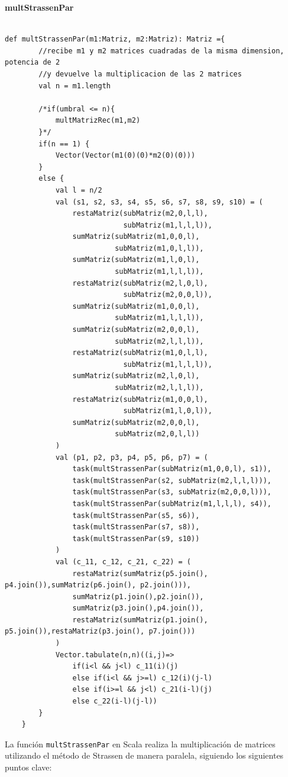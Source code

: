 \documentclass[12pt, a4paper]{article}
\begin{document}
\textbf{{multStrassenPar}} \\ \\
\begin{lstlisting}[caption=mult Strassen paralela, label=lst:scala_code11]
    def multStrassenPar(m1:Matriz, m2:Matriz): Matriz ={
        //recibe m1 y m2 matrices cuadradas de la misma dimension, potencia de 2
        //y devuelve la multiplicacion de las 2 matrices
        val n = m1.length
        
        /*if(umbral <= n){
            multMatrizRec(m1,m2)
        }*/
        if(n == 1) {
            Vector(Vector(m1(0)(0)*m2(0)(0)))
        }
        else {           
            val l = n/2
            val (s1, s2, s3, s4, s5, s6, s7, s8, s9, s10) = (
                restaMatriz(subMatriz(m2,0,l,l), 
                            subMatriz(m1,l,l,l)),
                sumMatriz(subMatriz(m1,0,0,l), 
                          subMatriz(m1,0,l,l)),
                sumMatriz(subMatriz(m1,l,0,l), 
                          subMatriz(m1,l,l,l)),
                restaMatriz(subMatriz(m2,l,0,l), 
                            subMatriz(m2,0,0,l)),
                sumMatriz(subMatriz(m1,0,0,l), 
                          subMatriz(m1,l,l,l)),
                sumMatriz(subMatriz(m2,0,0,l), 
                          subMatriz(m2,l,l,l)),
                restaMatriz(subMatriz(m1,0,l,l),
                            subMatriz(m1,l,l,l)),
                sumMatriz(subMatriz(m2,l,0,l),
                          subMatriz(m2,l,l,l)),
                restaMatriz(subMatriz(m1,0,0,l),
                            subMatriz(m1,l,0,l)),
                sumMatriz(subMatriz(m2,0,0,l),
                          subMatriz(m2,0,l,l))
            )
            val (p1, p2, p3, p4, p5, p6, p7) = (
                task(multStrassenPar(subMatriz(m1,0,0,l), s1)),
                task(multStrassenPar(s2, subMatriz(m2,l,l,l))),
                task(multStrassenPar(s3, subMatriz(m2,0,0,l))),
                task(multStrassenPar(subMatriz(m1,l,l,l), s4)),
                task(multStrassenPar(s5, s6)),
                task(multStrassenPar(s7, s8)),
                task(multStrassenPar(s9, s10))
            )
            val (c_11, c_12, c_21, c_22) = (
                restaMatriz(sumMatriz(p5.join(), p4.join()),sumMatriz(p6.join(), p2.join())),
                sumMatriz(p1.join(),p2.join()),
                sumMatriz(p3.join(),p4.join()),
                restaMatriz(sumMatriz(p1.join(), p5.join()),restaMatriz(p3.join(), p7.join()))
            )            
            Vector.tabulate(n,n)((i,j)=>
                if(i<l && j<l) c_11(i)(j)
                else if(i<l && j>=l) c_12(i)(j-l)
                else if(i>=l && j<l) c_21(i-l)(j)
                else c_22(i-l)(j-l))
        }
    }
\end{lstlisting}
La función \texttt{multStrassenPar} en Scala realiza la multiplicación de matrices utilizando el método de Strassen de manera paralela, siguiendo los siguientes puntos clave:
\end{document}
